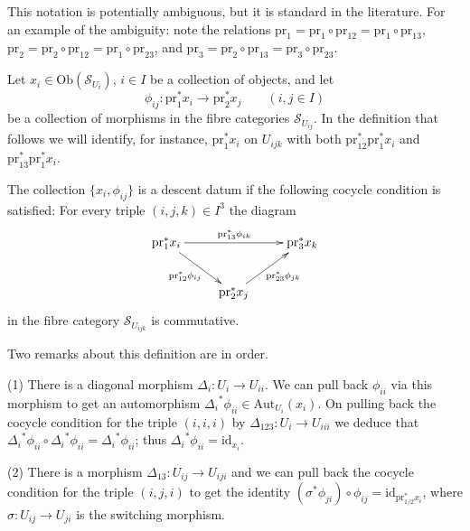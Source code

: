 \smallskip\noindent
This notation is potentially ambiguous, but it is standard in the
literature. For an example of the ambiguity: note the relations
$\text{pr}_1 = \text{pr}_{1} \circ \text{pr}_{12} =
\text{pr}_1 \circ \text{pr}_{13}$, $\text{pr}_2 =
\text{pr}_2 \circ \text{pr}_{12} = \text{pr}_1 \circ \text{pr}_{23}$,
and $\text{pr}_3 = \text{pr}_2 \circ \text{pr}_{13} =
\text{pr}_3 \circ \text{pr}_{23}$.

\smallskip\noindent
Let $x_i \in \text{Ob}(\mathcal{S}_{U_i})$, $i\in I$ be a collection of
objects, and let
$$
\phi_{ij} : \text{pr}_{1}^\ast x_i \longrightarrow
\text{pr}_{2}^\ast x_j \qquad (i,j \in I)
$$
be a collection of morphisms in the fibre categories
$\mathcal{S}_{U_{ij}}$. In the definition that follows we will
identify, for instance, $\text{pr}_1^\ast x_i$ on $U_{ijk}$ with both 
$\text{pr}_{12}^\ast \text{pr}_{1}^\ast x_i$ and 
$\text{pr}_{13}^\ast \text{pr}_{1}^\ast x_i$.

\begin{definition}
\label{definition-descent-data}
The collection $\{x_i, \phi_{ij}\}$ is a descent datum if
the following cocycle condition is satisfied: For every
triple $(i,j,k)\in I^3$ the diagram
$$
\xymatrix{
\text{pr}_1^\ast x_i 
	\ar[rr]^{\text{pr}_{13}^\ast \phi_{ik}}
	\ar[rd]_{\text{pr}_{12}^\ast \phi_{ij}}
& & 
\text{pr}_3^\ast x_k \\
& \text{pr}_2^\ast x_j \ar[ru]_{\text{pr}_{23}^\ast \phi_{jk}}
}
$$
in the fibre category $\mathcal{S}_{U_{ijk}}$ is commutative.
\end{definition}

\begin{remarks}
\label{remarks-definition-descent-datum}
Two remarks about this definition are in order.  

\smallskip\noindent
(1) There is a diagonal morphism $\Delta_i : U_i \to U_{ii}$. We can pull back
$\phi_{ii}$ via this morphism to get an automorphism 
${\Delta_i}^\ast \phi_{ii} \in \text{Aut}_{U_i}(x_i)$.
On pulling back the cocycle condition for the triple $(i,i,i)$ 
by $\Delta_{123} : U_i \to U_{iii}$ we deduce that
${\Delta_i}^\ast \phi_{ii} \circ {\Delta_i}^\ast \phi_{ii} =
{\Delta_i}^\ast \phi_{ii}$; thus ${\Delta_i}^\ast \phi_{ii} =
\text{id}_{x_i}$.

\smallskip\noindent
(2) There is a morphism
$\Delta_{13}: U_{ij} \to U_{iji}$ and we can pull back the
cocycle condition for the triple $(i,j,i)$ to get the
identity $(\sigma^\ast \phi_{ji}) \circ \phi_{ij} = 
\text{id}_{\text{pr}_{1/2}^\ast x_i}$, where $\sigma: U_{ij} \to U_{ji}$ is the
switching morphism.
\end{remarks}

